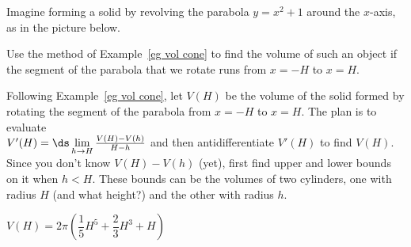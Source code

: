\begin{question}
Imagine forming a solid by revolving the parabola $y=x^2+1$ around the $x$-axis, as in the picture below.
\begin{center}
\end{center}
Use the method of Example~\ref*{eg vol cone} %
to find the volume of such an object if the segment of the parabola that we rotate runs from $x=-H$ to $x=H$.
\end{question}
\begin{hint}
Following Example~\ref*{eg vol cone}, %
let $V(H)$ be the volume of the solid formed by rotating the segment of the parabola from $x=-H$ to $x=H$.
            The plan is to evaluate\\
              $V'(H) = \ds\lim\limits_{h\rightarrow H}\frac{V(H)-V(h)}{H-h}$
            and then antidifferentiate $V'(H)$ to find $V(H)$. Since
            you don't know $V(H)-V(h)$ (yet), first find upper and lower
            bounds on it when $h<H$. These bounds can be the volumes of
            two cylinders, one with radius $H$ (and what height?)
            and the other with radius $h$.
\end{hint}
\begin{answer}
$V(H)=2\pi\left(\dfrac{1}{5}H^5+\dfrac{2}{3}H^3+H\right)$
\end{answer}
